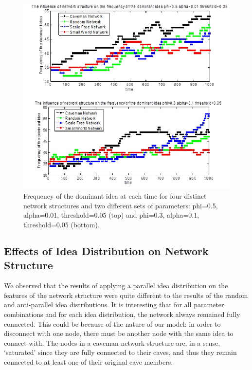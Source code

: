 \begin{figure}
[htp]
\begin{center}
\includegraphics{figex}
\end{center}
\caption{Frequency of the dominant idea at each time for four distinct network structures and two different sets of parameters: phi=0.5, alpha=0.01, threshold=0.05 (top) and phi=0.3, alpha=0.1, threshold=0.05 (bottom).}
\label {fig2}
\end{figure}




\subsection{Effects of Idea Distribution on Network Structure}


We observed that the results of applying a parallel idea distribution on the features of the network structure were quite different to the results of the random and anti-parallel idea distributions. It is interesting that for all parameter combinations and for each idea distribution, the network always remained fully connected. This could be because of the nature of our model: in order to disconnect with one node, there must be another node with the same idea to connect with. The nodes in a caveman network structure are, in a sense, `saturated' since they are fully connected to their caves, and thus they remain connected to at least one of their original cave members. 

